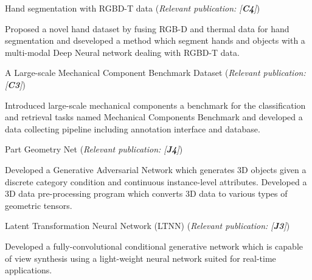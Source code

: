 


\begin{cventries}
\cvpub
{Hand segmentation with RGBD-T data (\textit{Relevant publication: [\textbf{C4}]})} %
{ %
\begin{cvitems}
\item {Proposed a novel hand dataset by fusing RGB-D and thermal data for hand segmentation and dseveloped a method which segment hands and objects with a multi-modal Deep Neural network dealing with RGBD-T data.}
\end{cvitems}
}

\cvpub
{A Large-scale Mechanical Component Benchmark Dataset (\textit{Relevant publication: [\textbf{C3}]})} %
{ %
\begin{cvitems}
\item {Introduced large-scale mechanical components a benchmark for the classification and retrieval tasks named Mechanical Components Benchmark and developed a data collecting pipeline including annotation interface and database.}
\end{cvitems}
}

\cvpub
{Part Geometry Net (\textit{Relevant publication: [\textbf{J4}]})} %
{ %
\begin{cvitems}
\item {Developed a Generative Adversarial Network which generates 3D objects given a discrete category condition and continuous instance-level attributes. Developed a 3D data pre-processing program which converts 3D data to various types of geometric tensors.}
\end{cvitems}
}


\cvpub
{Latent Transformation Neural Network (LTNN) (\textit{Relevant publication: [\textbf{J3}]})} %
{ %
\begin{cvitems}
\item {Developed a fully-convolutional conditional generative network which is capable of view synthesis using a light-weight neural network suited for real-time applications. }
\end{cvitems}
}


\end{cventries}
